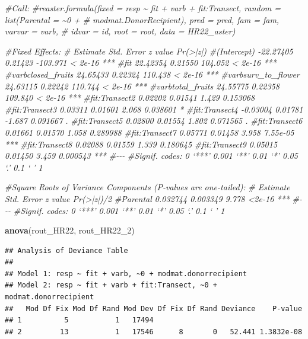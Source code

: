 \documentclass[
]{article}
\newenvironment{Shaded}{\begin{snugshade}}{\end{snugshade}}
\newcommand{\CommentTok}[1]{\textcolor[rgb]{0.56,0.35,0.01}{\textit{#1}}}
\newcommand{\FunctionTok}[1]{\textcolor[rgb]{0.13,0.29,0.53}{\textbf{#1}}}
\newcommand{\NormalTok}[1]{#1}
\begin{document}
\begin{Shaded}
\begin{Highlighting}[]
\CommentTok{\#Call:}
\CommentTok{\#reaster.formula(fixed = resp \textasciitilde{} fit + varb + fit:Transect, random = list(Parental = \textasciitilde{}0 + }
\CommentTok{\#    modmat.DonorRecipient), pred = pred, fam = fam, varvar = varb, }
\CommentTok{\#    idvar = id, root = root, data = HR22\_aster)}


\CommentTok{\#Fixed Effects:}
\CommentTok{\#                    Estimate Std. Error  z value Pr(\textgreater{}|z|)    }
\CommentTok{\#(Intercept)        {-}22.27405    0.21423 {-}103.971  \textless{} 2e{-}16 ***}
\CommentTok{\#fit                 22.42354    0.21550  104.052  \textless{} 2e{-}16 ***}
\CommentTok{\#varbclosed\_fruits   24.65433    0.22324  110.438  \textless{} 2e{-}16 ***}
\CommentTok{\#varbsurv\_to\_flower  24.63115    0.22242  110.744  \textless{} 2e{-}16 ***}
\CommentTok{\#varbtotal\_fruits    24.55775    0.22358  109.840  \textless{} 2e{-}16 ***}
\CommentTok{\#fit:Transect2        0.02202    0.01541    1.429 0.153068    }
\CommentTok{\#fit:Transect3        0.03311    0.01601    2.068 0.038601 *  }
\CommentTok{\#fit:Transect4       {-}0.03004    0.01781   {-}1.687 0.091667 .  }
\CommentTok{\#fit:Transect5        0.02800    0.01554    1.802 0.071565 .  }
\CommentTok{\#fit:Transect6        0.01661    0.01570    1.058 0.289988    }
\CommentTok{\#fit:Transect7        0.05771    0.01458    3.958 7.55e{-}05 ***}
\CommentTok{\#fit:Transect8        0.02088    0.01559    1.339 0.180645    }
\CommentTok{\#fit:Transect9        0.05015    0.01450    3.459 0.000543 ***}
\CommentTok{\#{-}{-}{-}}
\CommentTok{\#Signif. codes:  0 ‘***’ 0.001 ‘**’ 0.01 ‘*’ 0.05 ‘.’ 0.1 ‘ ’ 1}

\CommentTok{\#Square Roots of Variance Components (P{-}values are one{-}tailed):}
\CommentTok{\#         Estimate Std. Error z value Pr(\textgreater{}|z|)/2    }
\CommentTok{\#Parental 0.032744   0.003349   9.778     \textless{}2e{-}16 ***}
\CommentTok{\#{-}{-}{-}}
\CommentTok{\#Signif. codes:  0 ‘***’ 0.001 ‘**’ 0.01 ‘*’ 0.05 ‘.’ 0.1 ‘ ’ 1}

\FunctionTok{anova}\NormalTok{(rout\_HR22, rout\_HR22\_2)}
\end{Highlighting}
\end{Shaded}

\begin{verbatim}
## Analysis of Deviance Table
## 
## Model 1: resp ~ fit + varb, ~0 + modmat.donorrecipient
## Model 2: resp ~ fit + varb + fit:Transect, ~0 + modmat.donorrecipient
##   Mod Df Fix Mod Df Rand Mod Dev Df Fix Df Rand Deviance    P-value
## 1          5           1   17494                                   
## 2         13           1   17546      8       0   52.441 1.3832e-08
\end{verbatim}
\end{document}
